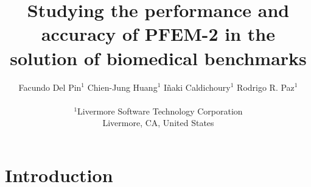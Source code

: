 \documentclass{article}
\begin{document}
\title{Studying the performance and accuracy of PFEM-2 in the solution of biomedical benchmarks}
\author{Facundo Del Pin$^1$   Chien-Jung Huang$^{1}$  
  I\~naki Caldichoury$^1$ Rodrigo R. Paz$^1$ \\  \\
$^1$Livermore Software Technology Corporation\\ Livermore,  CA, United
States
}


\maketitle

\begin{abstract}

\end{abstract}



\section{Introduction}

\end{document}
